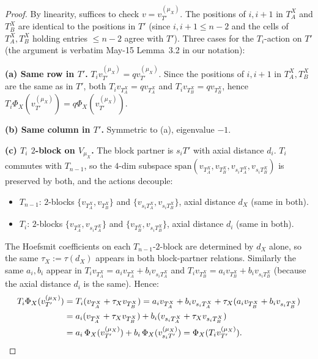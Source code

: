 \documentclass[11pt]{article}
\theoremstyle{definition}
\begin{document}
\begin{proof}
By linearity, suffices to check $v=v_{T'}^{(\mu_X)}$.  The
positions of $i,i{+}1$ in $T^X_A$ and $T^X_B$ are identical to the
positions in $T'$ (since $i,i{+}1\le n-2$ and the cells of
$T^X_A,T^X_B$ holding entries $\le n-2$ agree with $T'$).  Three
cases for the $T_i$-action on $T'$ (the argument is verbatim
May-15 Lemma~3.2 in our notation):

\noindent\textbf{(a) Same row in $T'$.}  $T_iv_{T'}^{(\mu_X)}=
qv_{T'}^{(\mu_X)}$.  Since the positions of $i,i{+}1$ in
$T^X_A,T^X_B$ are the same as in $T'$, both $T_iv_{T^X_A}=qv_{T^X_A}$
and $T_iv_{T^X_B}=qv_{T^X_B}$, hence $T_i\Phi_X(v_{T'}^{(\mu_X)})=
q\Phi_X(v_{T'}^{(\mu_X)})$.

\noindent\textbf{(b) Same column in $T'$.}  Symmetric to (a),
eigenvalue $-1$.

\noindent\textbf{(c) $T_i$ $2$-block on $V_{\mu_X}$.}  The block
partner is $s_iT'$ with axial distance $d_i$.  $T_i$ commutes with
$T_{n-1}$, so the $4$-dim subspace
$\mathrm{span}(v_{T^X_A},v_{T^X_B},v_{s_iT^X_A},v_{s_iT^X_B})$ is
preserved by both, and the actions decouple:
\begin{itemize}[leftmargin=2em,topsep=0.3em,itemsep=0.2em]
\item $T_{n-1}$: $2$-blocks $\{v_{T^X_A},v_{T^X_B}\}$ and
$\{v_{s_iT^X_A},v_{s_iT^X_B}\}$, axial distance $d_X$ (same in both).
\item $T_i$: $2$-blocks $\{v_{T^X_A},v_{s_iT^X_A}\}$ and
$\{v_{T^X_B},v_{s_iT^X_B}\}$, axial distance $d_i$ (same in both).
\end{itemize}
The Hoefsmit coefficients on each $T_{n-1}$-$2$-block are
determined by $d_X$ alone, so the same $\tau_X:=\tau(d_X)$ appears
in both block-partner relations.  Similarly the same $a_i,b_i$
appear in $T_iv_{T^X_A}=a_iv_{T^X_A}+b_iv_{s_iT^X_A}$ and
$T_iv_{T^X_B}=a_iv_{T^X_B}+b_iv_{s_iT^X_B}$ (because the axial
distance $d_i$ is the same).  Hence:
\begin{align*}
   T_i\Phi_X(v_{T'}^{(\mu_X)})
   &= T_i(v_{T^X_A}+\tau_X v_{T^X_B})
   = a_iv_{T^X_A}+b_iv_{s_iT^X_A}+\tau_X(a_iv_{T^X_B}+b_iv_{s_iT^X_B})\\
   &= a_i(v_{T^X_A}+\tau_Xv_{T^X_B})+b_i(v_{s_iT^X_A}+\tau_Xv_{s_iT^X_B})\\
   &= a_i\,\Phi_X(v_{T'}^{(\mu_X)})+b_i\,\Phi_X(v_{s_iT'}^{(\mu_X)})
   = \Phi_X(T_iv_{T'}^{(\mu_X)}).\qedhere
\end{align*}
\end{proof}
\end{document}
